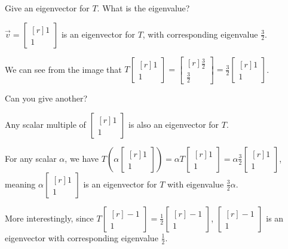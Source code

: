 \documentclass{problemset}
\newcommand{\mat}[1]{\begin{bmatrix*}[r]#1\end{bmatrix*}}
\begin{document}
	\begin{parts}
		\item Give an eigenvector for $T$. What is the eigenvalue?
			\begin{solution}
				$\vec v=\mat{1\\1}$ is an eigenvector for $T$, with corresponding
				eigenvalue $\frac{3}{2}$.

				We can see from the image that
				$T\mat{1\\1}=\mat{\frac{3}{2}\\\frac{3}{2}}=\frac{3}{2}\mat{1\\1}$.
			\end{solution}
		\item Can you give another?
			\begin{solution}
				Any scalar multiple of $\mat{1\\1}$ is also an eigenvector for $T$.

				For any scalar $\alpha$, we have
				$T\left(\alpha\mat{1\\1}\right)=\alpha T\mat{1\\1}=\alpha\frac{3}{2}\mat{1\\1}$,
				meaning $\alpha\mat{1\\1}$ is an eigenvector for $T$ with
				eigenvalue $\frac{3}{2}\alpha$.

				More interestingly, since $T\mat{-1\\1}=\frac{1}{2}\mat{-1\\1}$,
				$\mat{-1\\1}$ is an eigenvector with corresponding eigenvalue
				$\frac{1}{2}$.
			\end{solution}
	\end{parts}
\end{document}
